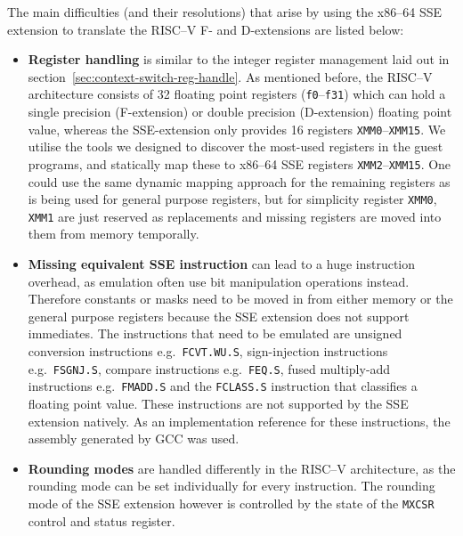 The main difficulties (and their resolutions) that arise by using the x86--64 SSE extension to translate the RISC--V F- and D-extensions are listed below:
\begin{itemize}
    \item \textbf{Register handling} is similar to the integer register management laid out in section~\ref{sec:context-switch-reg-handle}.
            As mentioned before, the RISC--V architecture consists of 32 floating point registers (\texttt{f0}--\texttt{f31}) which can hold a single precision (F-extension) or double precision (D-extension) floating point value, whereas the SSE-extension only provides 16 registers \texttt{XMM0}--\texttt{XMM15}.
            We utilise the tools we designed to discover the most-used registers in the guest programs, and statically map these to x86--64 SSE registers \texttt{XMM2}--\texttt{XMM15}.
            One could use the same dynamic mapping approach for the remaining registers as is being used for general purpose registers, but for simplicity register \texttt{XMM0}, \texttt{XMM1} are just reserved as replacements and missing registers are moved into them from memory temporally.
    \item \textbf{Missing equivalent SSE instruction} can lead to a huge instruction overhead, as emulation often use bit manipulation operations instead.
            Therefore constants or masks need to be moved in from either memory or the general purpose registers because the SSE extension does not support immediates.
            The instructions that need to be emulated are unsigned conversion instructions e.g.~\texttt{FCVT.WU.S}, sign-injection instructions e.g.~\texttt{FSGNJ.S}, compare instructions e.g.~\texttt{FEQ.S}, fused multiply-add instructions e.g.~\texttt{FMADD.S} and the \texttt{FCLASS.S} instruction that classifies a floating point value.
            These instructions are not supported by the SSE extension natively.
            As an implementation reference for these instructions, the assembly generated by GCC was used.
    \item \textbf{Rounding modes} are handled differently in the RISC--V architecture, as the rounding mode can be set individually for every instruction.
            The rounding mode of the SSE extension however is controlled by the state of the \texttt{MXCSR} control and status register.

\end{itemize}
